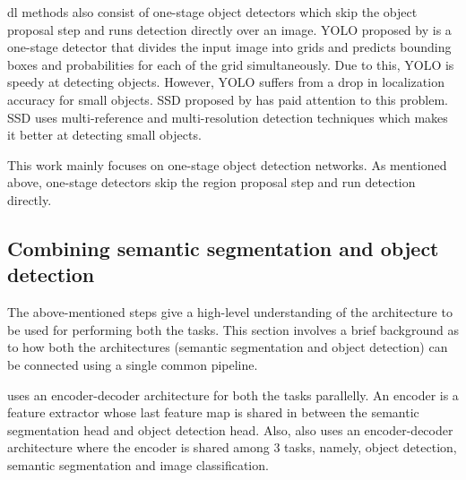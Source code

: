 \par
\ac{dl} methods also consist of one-stage object detectors which skip the object proposal step and runs detection directly over an image. YOLO proposed by \cite{DBLP:journals/corr/RedmonDGF15} is a one-stage detector that divides the input image into grids and predicts bounding boxes and probabilities for each of the grid simultaneously. Due to this, YOLO is speedy at detecting objects. However, YOLO suffers from a drop in localization accuracy for small objects. SSD proposed by \cite{liu2016ssd} has paid attention to this problem. SSD uses multi-reference and multi-resolution detection techniques which makes it better at detecting small objects.
\par
This work mainly focuses on one-stage object detection networks. As mentioned above, one-stage detectors skip the region proposal step and run detection directly. 

\clearpage

\subsection{Combining semantic segmentation and object detection}

The above-mentioned steps give a high-level understanding of the architecture to be used for performing both the tasks. This section involves a brief background as to how both the architectures (semantic segmentation and object detection) can be connected using a single common pipeline. 
\par
\cite{salscheider2019simultaneous} uses an encoder-decoder architecture for both the tasks parallelly. An encoder is a feature extractor whose last feature map is shared in between the semantic segmentation head and object detection head. Also, \cite{DBLP:journals/corr/TeichmannWZCU16} also uses an encoder-decoder architecture where the encoder is shared among 3 tasks, namely, object detection, semantic segmentation and image classification. 

\afterpage{\null\newpage}